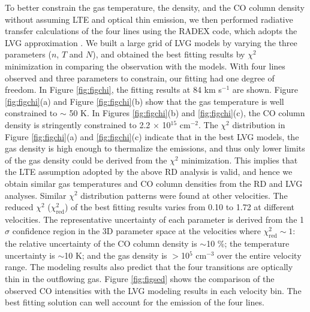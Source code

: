 To better constrain the gas temperature, the density, and the CO column density without assuming LTE and optical thin emission, we then performed radiative transfer calculations of the four lines using the RADEX code, which adopts the LVG approximation \citep{2007A&A...468..627V}. We built a large grid of LVG models by varying the three parameters ($n$, $T$ and $N$), and obtained the best fitting results by $\chi^2$ minimization in comparing the observation with the models. With four lines observed and three parameters to constrain, our fitting had one degree of freedom. In Figure \ref{fig:figchi}, the fitting results at 84 km s$^{-1}$ are shown. Figure \ref{fig:figchi}(a) and Figure \ref{fig:figchi}(b) show that the gas temperature is well constrained to $\sim$ 50 K. In Figures \ref{fig:figchi}(b) and \ref{fig:figchi}(c), the CO column density is stringently constrained to 2.2 $\times$ 10$^{15}$ cm$^{-2}$. The $\chi^2$ distribution in Figure \ref{fig:figchi}(a) and \ref{fig:figchi}(c) indicate that in the best LVG models, the gas density is high enough to thermalize the emissions, and thus only lower limits of the gas density could be derived from the $\chi^2$ minimization. This implies that the LTE assumption adopted by the above RD analysis is valid, and hence we obtain similar gas temperatures and CO column densities from the RD and LVG analyses. Similar $\chi^2$ distribution patterns were found at other velocities. The reduced $\chi^2$ ($\chi^2_{\mathrm{red}}$) of the best fitting results varies from 0.10 to 1.72 at different velocities. The representative uncertainty of each parameter is derived from the 1$\sigma$ confidence region in the 3D parameter space at the velocities where $\chi^2_{\mathrm{red}} \sim 1$: the relative uncertainty of the CO column density is $\sim$10 \%; the temperature uncertainty is $\sim$10 K; and the gas density is $>$10$^5$ cm$^{-3}$ over the entire velocity range. The modeling results also predict that the four transitions are optically thin in the outflowing gas. Figure \ref{fig:figsed} shows the comparison of the observed CO intensities with the LVG modeling results in each velocity bin. The best fitting solution can well account for the emission of the four lines.


